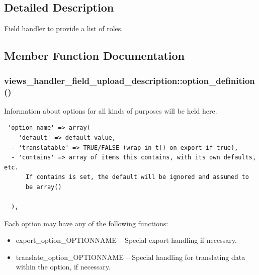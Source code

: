 \subsection{Detailed Description}
Field handler to provide a list of roles. 

\subsection{Member Function Documentation}
\hypertarget{classviews__handler__field__upload__description_506091a767dacc29b687de0f0802933b}{
\subsubsection[{option\_\-definition}]{\setlength{\rightskip}{0pt plus 5cm}views\_\-handler\_\-field\_\-upload\_\-description::option\_\-definition ()}}
\label{classviews__handler__field__upload__description_506091a767dacc29b687de0f0802933b}


Information about options for all kinds of purposes will be held here. 

\begin{Code}\begin{verbatim} 'option_name' => array(
  - 'default' => default value,
  - 'translatable' => TRUE/FALSE (wrap in t() on export if true),
  - 'contains' => array of items this contains, with its own defaults, etc.
      If contains is set, the default will be ignored and assumed to
      be array()

  ),
\end{verbatim}
\end{Code}

 Each option may have any of the following functions:\begin{itemize}
\item export\_\-option\_\-OPTIONNAME -- Special export handling if necessary.\item translate\_\-option\_\-OPTIONNAME -- Special handling for translating data within the option, if necessary. \end{itemize}


